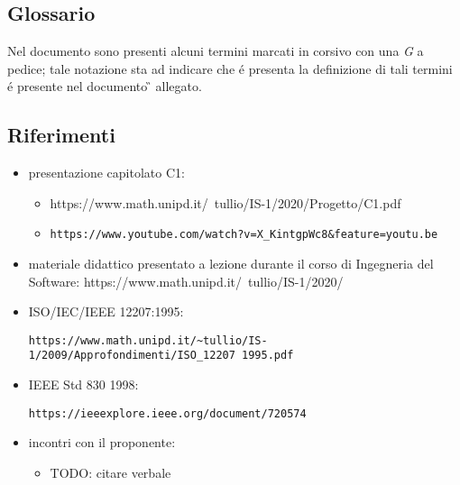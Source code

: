 \subsection{Glossario}
Nel documento sono presenti alcuni termini marcati in corsivo con una \emph{G} a pedice; tale notazione sta ad indicare che \'{e} presenta la definizione di tali termini \'{e} presente nel documento \G{} allegato.

\subsection{Riferimenti}
\begin{itemize}
    \item presentazione capitolato C1:
    \begin{itemize} 
        \item https://www.math.unipd.it/~tullio/IS-1/2020/Progetto/C1.pdf
        \item \begin{verbatim}https://www.youtube.com/watch?v=X_KintgpWc8&feature=youtu.be\end{verbatim}
    \end{itemize}
    \item materiale didattico presentato a lezione durante il corso di Ingegneria del Software: https://www.math.unipd.it/~tullio/IS-1/2020/
    \item ISO/IEC/IEEE 12207:1995: \begin{verbatim}https://www.math.unipd.it/~tullio/IS-1/2009/Approfondimenti/ISO_12207 1995.pdf\end{verbatim}
    \item IEEE Std 830 1998: \begin{verbatim}https://ieeexplore.ieee.org/document/720574\end{verbatim}
    \item incontri con il proponente: 
    \begin{itemize}
        \item TODO: citare verbale
    \end{itemize}
\end{itemize}